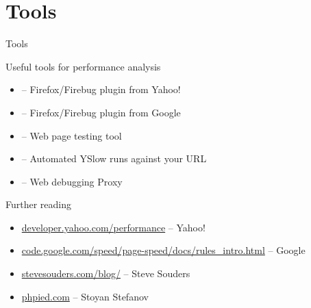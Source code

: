\documentclass{beamer}
\begin{document}
\section{Tools}

\begin{frame}{}
  \begin{block}{}
  \begin{center}
  Tools
  \end{center}
  \end{block}
\end{frame}

\begin{frame}{Useful tools for performance analysis}
  \begin{itemize}
  \item \href{http://developer.yahoo.com/yslow/}{} -- Firefox/Firebug plugin from Yahoo!
  \item \href{http://code.google.com/speed/page-speed/}{} -- Firefox/Firebug plugin from Google
  \item \href{http://www.webpagetest.org/}{} -- Web page testing tool
  \item \href{http://www.showslow.org/}{} -- Automated YSlow runs against your URL
  \item \href{http://www.fiddler2.com/fiddler2/}{} -- Web debugging Proxy
  \end{itemize}
\end{frame}

\begin{frame}{Further reading}
  \begin{itemize}
  \item \href{http://developer.yahoo.com/performance}{developer.yahoo.com/performance} -- Yahoo!
  \item \href{http://code.google.com/speed/page-speed/docs/rules_intro.html}{code.google.com/speed/page-speed/docs/rules\_intro.html} -- Google
  \item \href{http://stevesouders.com/blog/}{stevesouders.com/blog/} -- Steve Souders
  \item \href{http://phpied.com/}{phpied.com} -- Stoyan Stefanov
  \end{itemize}
\end{frame}
\end{document}
